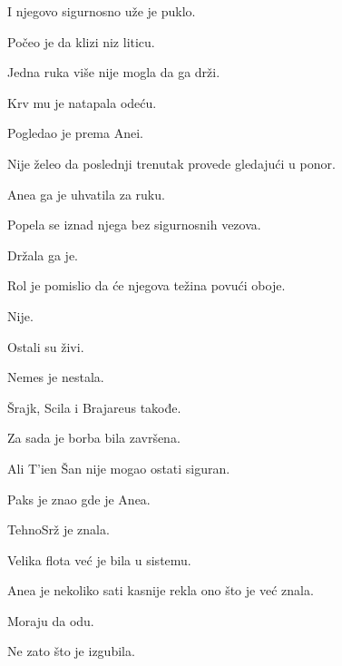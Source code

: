 \bigskip

I njegovo sigurnosno uže je puklo.

\bigskip

Počeo je da klizi niz liticu.

\bigskip

Jedna ruka više nije mogla da ga drži.

Krv mu je natapala odeću.

\bigskip

Pogledao je prema Anei.

\bigskip

Nije želeo da poslednji trenutak provede gledajući u ponor.

\bigskip

Anea ga je uhvatila za ruku.

\bigskip

Popela se iznad njega bez sigurnosnih vezova.

\bigskip

Držala ga je.

\bigskip

Rol je pomislio da će njegova težina povući oboje.

\bigskip

Nije.

\bigskip

Ostali su živi.

\bigskip

Nemes je nestala.

\bigskip

Šrajk, Scila i Brajareus takođe.

\bigskip

Za sada je borba bila završena.

\bigskip

Ali T'ien Šan nije mogao ostati siguran.

\bigskip

Paks je znao gde je Anea.

TehnoSrž je znala.

\bigskip

Velika flota već je bila u sistemu.

\bigskip

Anea je nekoliko sati kasnije rekla ono što je već znala.

\bigskip

Moraju da odu.

\bigskip

Ne zato što je izgubila.

\bigskip

